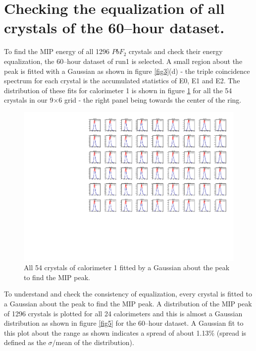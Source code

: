 \documentclass[article,accept,moreauthors,pdftex,10pt,a4paper]{../MDPI_template/Definitions/mdpi}
\begin{document}
\section{Checking the equalization of all crystals of the 60--hour dataset.} 
\noindent To find the MIP energy of all 1296 $PbF_2$ crystals and check their energy equalization, 
the 60--hour dataset of run1 is selected.
A small region about the peak is fitted with a Gaussian as shown in figure \ref{fig3}(d) - the triple coincidence spectrum 
for each crystal is the accumulated statistics of E0, E1 and E2. The distribution of these fits for calorimeter 1 
is shown in figure \ref{fig4} for all the 54 crystals in our 9$\times$6 grid - the right panel being towards the center of the ring. 

\begin{figure}[H]
\centering
\includegraphics[width=17.2 cm]{calo1.pdf}
\caption{\label{fig4}All 54 crystals of calorimeter 1 fitted by a Gaussian about the peak to find the MIP peak. }
\end{figure} 

To understand and check the consistency of equalization, 
every crystal is fitted to a Gaussian about the peak to find the MIP peak. 
A distribution of the MIP peak of 1296 crystals is plotted for all 24 calorimeters and this is almost a Gaussian 
distribution as shown in figure \ref{fig5} for the 60--hour dataset. 
A Gaussian fit to this plot about the range as shown indicates a spread of about 
1.13\% (spread is defined as the $\sigma$/mean of the distribution). %
\end{document}
